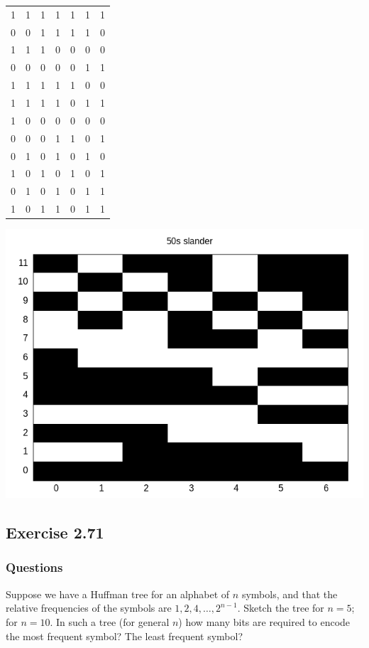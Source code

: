 \documentclass[final,fleqn,titlepage,twoside]{article}
\begin{document}
\begin{center}
\begin{tabular}{rrrrrrr}
1 & 1 & 1 & 1 & 1 & 1 & 1\\[0pt]
0 & 0 & 1 & 1 & 1 & 1 & 0\\[0pt]
1 & 1 & 1 & 0 & 0 & 0 & 0\\[0pt]
0 & 0 & 0 & 0 & 0 & 1 & 1\\[0pt]
1 & 1 & 1 & 1 & 1 & 0 & 0\\[0pt]
1 & 1 & 1 & 1 & 0 & 1 & 1\\[0pt]
1 & 0 & 0 & 0 & 0 & 0 & 0\\[0pt]
0 & 0 & 0 & 1 & 1 & 0 & 1\\[0pt]
0 & 1 & 0 & 1 & 0 & 1 & 0\\[0pt]
1 & 0 & 1 & 0 & 1 & 0 & 1\\[0pt]
0 & 1 & 0 & 1 & 0 & 1 & 1\\[0pt]
1 & 0 & 1 & 1 & 0 & 1 & 1\\[0pt]
\hline
\end{tabular}
\end{center}


\begin{center}
\includegraphics[width=.9\linewidth]{2/fig/2-70.png}
\end{center}

\subsection{Exercise 2.71}
\label{sec:org29b0b19}
\subsubsection{Questions}
\label{sec:org1d174c1}
Suppose we have a Huffman tree for an alphabet of \(n\) symbols, and that the
relative frequencies of the symbols are \(1, 2, 4, \dots, 2^{n-1}\). Sketch the
tree for \(n=5\); for \(n=10\). In such a tree (for general \(n\)) how many bits
are required to encode the most frequent symbol? The least frequent symbol?
\end{document}

